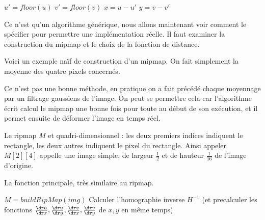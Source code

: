 \begin{algorithm}[H]
\caption{$bilinearMipMap(u,v,M)$}
$u'=floor(u)$\;
$v' = floor(v)$\;
$x=u-u'$\;
$y = v-v'$\;
\;
\end{algorithm}

\medbreak
\medbreak
Ce n'est qu'un algorithme générique, nous allons maintenant voir comment le spécifier pour permettre une implémentation réelle. Il faut examiner la construction du mipmap et le choix de la fonction de distance.


Voici un exemple naïf de construction d'un mipmap. On fait simplement la moyenne des quatre pixels concernés.
 \medbreak
  \medbreak
 \begin{algorithm}[H]
 \caption{$buildMipMap(*img)$}
 \end{algorithm}
 \medbreak
  \medbreak
 Ce n'est pas une bonne méthode, en pratique on a fait précédé chaque moyennage par un filtrage gaussiens de l'image. On peut se permettre cela car l'algorithme écrit calcul le mipmap une bonne fois pour toute au début de son exécution, et il permet ensuite de déformer l'image en temps réel.  



Le ripmap $M$ et quadri-dimensionnel  : les deux premiers indices indiquent le rectangle, les deux autres indiquent le pixel du rectangle. Ainsi appeler $M[2][4]$ appelle une image simple, de largeur $\frac{1}{2}$ et de hauteur $\frac{1}{16}$ de l'image d'origine.


La fonction principale, très similaire au ripmap.
\medbreak
\medbreak
\begin{algorithm}[H]
\caption{$mainFunction(img,H,I)$}
$M = buildRipMap(img)$\;
Calculer l'homographie inverse $H^{-1}$ (et precalculer les fonctions $\frac{\dr u}{\dr x},\frac{\dr u}{\dr y},\frac{\dr v}{\dr x},\frac{\dr v}{\dr y}$ de $x,y$ en même temps)\;
\end{algorithm}

